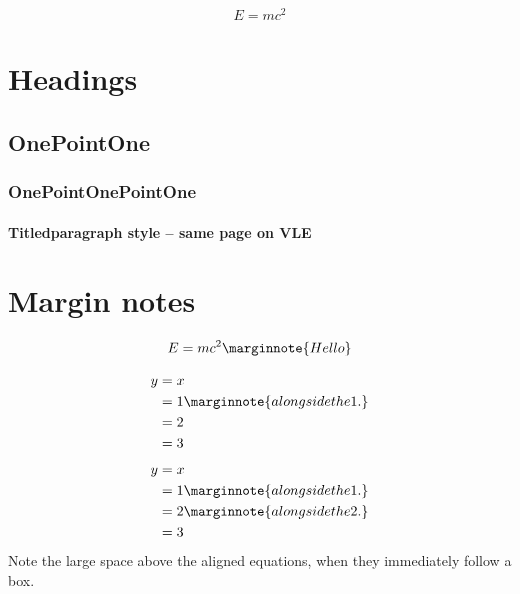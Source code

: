 \documentclass[solutionsatend,twocolumnsolutions]{ouunit}
\author{Robert Hasson}
\newenvironment{highlight}[1][]{\begin{style2box}[#1]}{\end{style2box}}
\begin{document}
\makefrontpages
\introduction




\lipsum[133] 

\[
E=mc^2
\]

\lipsum[133]
\section{Headings}
\lipsum[133]
\subsection{OnePointOne}
\lipsum[133]
\subsubsection{OnePointOnePointOne}
\lipsum[133]
\paragraph{Titledparagraph style -- same page on VLE}
\lipsum[133]
\section{Margin notes}
\begin{highlight}
\lipsum[133]

\lipsum[133]
\[
E=mc^2\marginnote{Hello}
\]
\end{highlight}
\lipsum[133]
\begin{highlight}
\lipsum[133]
\end{highlight}
\[%
\begin{aligned}
y &=x\\
&=1\marginnote{alongside the 1.}\\
&=2\\
&=3
\end{aligned}
\]
\begin{align*}
y &=x\\
&=1\marginnote{alongside the 1.}\\
&=2\marginnote{alongside the 2.}\\
&=3
\end{align*}
Note the large space above the aligned equations, when they immediately follow a box.
\begin{highlight}[Title]
\lipsum[133]
\end{highlight}
\end{document}
